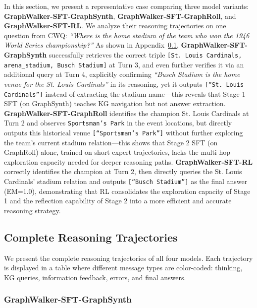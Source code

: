 In this section, we present a representative case comparing three model variants: \textbf{GraphWalker-SFT-GraphSynth}, \textbf{GraphWalker-SFT-GraphRoll}, and \textbf{GraphWalker-SFT-RL}. We analyze their reasoning trajectories on one question from CWQ: \textit{``Where is the home stadium of the team who won the 1946 World Series championship?''}
As shown in Appendix~\ref{app:four_cases}, \textbf{GraphWalker-SFT-GraphSynth} successfully retrieves the correct triple \texttt{[St. Louis Cardinals, arena\_stadium, Busch Stadium]} at Turn 3, and even further verifies it via an additional query at Turn 4, explicitly confirming \textit{``Busch Stadium is the home venue for the St. Louis Cardinals''} in its reasoning, yet it outputs \texttt{[``St. Louis Cardinals'']} instead of extracting the stadium name---this reveals that Stage 1 SFT (on GraphSynth) teaches KG navigation but not answer extraction.
\textbf{GraphWalker-SFT-GraphRoll} identifies the champion St. Louis Cardinals at Turn 2 and observes \texttt{Sportsman's Park} in the event locations, but directly outputs this historical venue \texttt{[``Sportsman's Park'']} without further exploring the team's current stadium relation---this shows that Stage 2 SFT (on GraphRoll) alone, trained on short expert trajectories, lacks the multi-hop exploration capacity needed for deeper reasoning paths.
\textbf{GraphWalker-SFT-RL} correctly identifies the champion at Turn 2, then directly queries the St. Louis Cardinals' stadium relation and outputs \texttt{[``Busch Stadium'']} as the final answer (EM=1.0), demonstrating that RL consolidates the exploration capacity of Stage 1 and the reflection capability of Stage 2 into a more efficient and accurate reasoning strategy.


\subsection{Complete Reasoning Trajectories}
\label{app:four_cases}

We present the complete reasoning trajectories of all four models. Each trajectory is displayed in a table where different message types are color-coded: \colorbox{blue!10}{thinking}, \colorbox{green!10}{KG queries}, \colorbox{yellow!10}{information feedback}, \colorbox{red!10}{errors}, and final answers.

\subsubsection{GraphWalker-SFT-GraphSynth}

